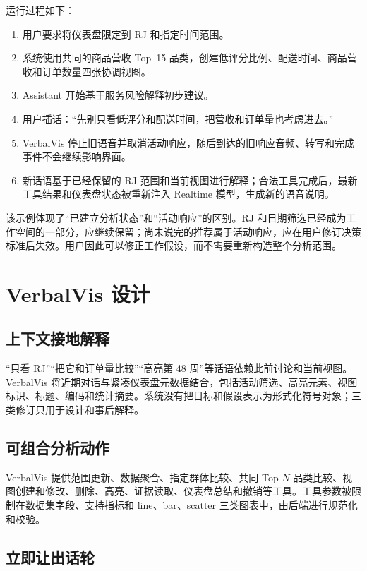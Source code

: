 \documentclass[UTF8,a4paper,10.5pt]{ctexart}
\begin{document}
运行过程如下：

\begin{enumerate}
\item 用户要求将仪表盘限定到 RJ 和指定时间范围。
\item 系统使用共同的商品营收 Top~15 品类，创建低评分比例、配送时间、商品营收和订单数量四张协调视图。
\item Assistant 开始基于服务风险解释初步建议。
\item 用户插话：“先别只看低评分和配送时间，把营收和订单量也考虑进去。”
\item VerbalVis 停止旧语音并取消活动响应，随后到达的旧响应音频、转写和完成事件不会继续影响界面。
\item 新话语基于已经保留的 RJ 范围和当前视图进行解释；合法工具完成后，最新工具结果和仪表盘状态被重新注入 Realtime 模型，生成新的语音说明。
\end{enumerate}

该示例体现了“已建立分析状态”和“活动响应”的区别。RJ 和日期筛选已经成为工作空间的一部分，应继续保留；尚未说完的推荐属于活动响应，应在用户修订决策标准后失效。用户因此可以修正工作假设，而不需要重新构造整个分析范围。

\section{VerbalVis 设计}

\subsection{上下文接地解释}

“只看 RJ”“把它和订单量比较”“高亮第 48 周”等话语依赖此前讨论和当前视图。VerbalVis 将近期对话与紧凑仪表盘元数据结合，包括活动筛选、高亮元素、视图标识、标题、编码和统计摘要。系统没有把目标和假设表示为形式化符号对象；三类修订只用于设计和事后解释。

\subsection{可组合分析动作}

VerbalVis 提供范围更新、数据聚合、指定群体比较、共同 Top-$N$ 品类比较、视图创建和修改、删除、高亮、证据读取、仪表盘总结和撤销等工具。工具参数被限制在数据集字段、支持指标和 line、bar、scatter 三类图表中，由后端进行规范化和校验。

\subsection{立即让出话轮}
\end{document}
